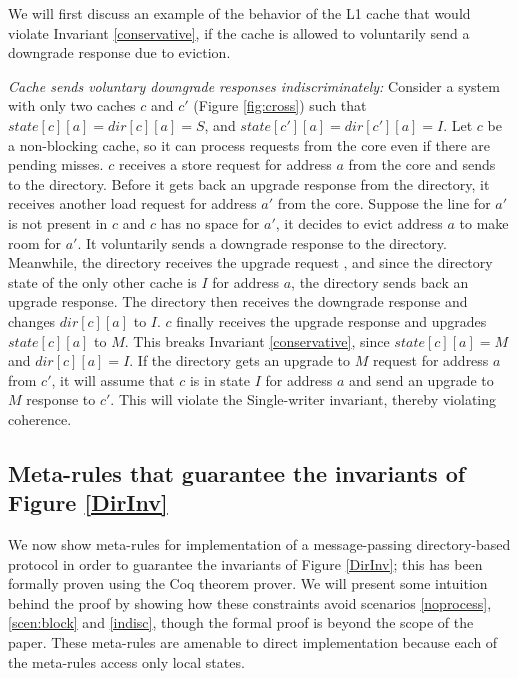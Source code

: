 
We will first discuss an example of the behavior of the L1 cache that would
violate Invariant \ref{conservative}, if the cache is allowed to voluntarily
send a downgrade response due to eviction.

\begin{scen}
\emph{Cache sends voluntary downgrade responses indiscriminately:}
Consider a system with only two caches $c$ and $c'$ (Figure \ref{fig:cross})
such that $state[c][a] = dir[c][a] = S$, and $state[c'][a] = dir[c'][a] = I$.
Let $c$ be a non-blocking cache, so it can process requests from the core even
if there are pending misses. $c$ receives a store request for address $a$ from
the core and sends  to the directory. Before it gets back an
upgrade response from the directory, it receives another load request for
address $a'$ from the core. Suppose the line for $a'$ is not present in $c$ and
$c$ has no space for $a'$, it decides to evict address $a$ to make room for
$a'$. It voluntarily sends a downgrade response  to the
directory. Meanwhile, the directory receives the upgrade request
, and since the directory state of the only other cache is $I$
for address $a$, the directory sends back an upgrade response. The directory
then receives the downgrade response  and changes $dir[c][a]$
to $I$. $c$ finally receives the upgrade response  and
upgrades $state[c][a]$ to $M$. This breaks Invariant \ref{conservative}, since
$state[c][a] = M$ and $dir[c][a] = I$. If the directory gets an upgrade to $M$
request for address $a$ from $c'$, it will assume that $c$ is in state $I$ for
address $a$ and send an upgrade to $M$ response to $c'$. This will violate the
Single-writer invariant, thereby violating coherence.
\label{indisc}
\end{scen}

\subsection{Meta-rules that guarantee the invariants of Figure \ref{DirInv}}

We now show meta-rules for implementation of a message-passing directory-based
protocol in order to guarantee the invariants of Figure \ref{DirInv}; this has
been formally proven using the Coq theorem prover. We will present some
intuition behind the proof by showing how these constraints avoid scenarios
\ref{noprocess}, \ref{scen:block} and \ref{indisc}, though the formal proof is
beyond the scope of the paper. These meta-rules are amenable to direct
implementation because each of the meta-rules access only local states.

